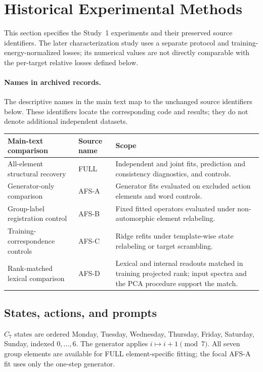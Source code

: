 \section{Historical Experimental Methods}
\label{app:methods}
This section specifies the Study~1 experiments and their preserved source identifiers. The later characterization study uses a separate protocol and training-energy-normalized losses; its numerical values are not directly comparable with the per-target relative losses defined below.

\paragraph{Names in archived records.}
The descriptive names in the main text map to the unchanged source identifiers below. These identifiers locate the corresponding code and results; they do not denote additional independent datasets.
\begin{center}
\small
\begin{tabular}{@{}p{}p{}p{}@{}}
\toprule
Main-text comparison & Source name & Scope \\
\midrule
All-element structural recovery & FULL & Independent and joint fits, prediction and consistency diagnostics, and controls. \\
Generator-only comparison & AFS-A & Generator fits evaluated on excluded action elements and word controls. \\
Group-label registration control & AFS-B & Fixed fitted operators evaluated under non-automorphic element relabeling. \\
Training-correspondence controls & AFS-C & Ridge refits under template-wise state relabeling or target scrambling. \\
Rank-matched lexical comparison & AFS-D & Lexical and internal readouts matched in training projected rank; input spectra and the PCA procedure support the match. \\
\bottomrule
\end{tabular}
\end{center}
\subsection{States, actions, and prompts}
$C_7$ states are ordered Monday, Tuesday, Wednesday, Thursday, Friday, Saturday, Sunday, indexed $0,\ldots,6$. The generator applies $i\mapsto i+1\pmod7$. All seven group elements are available for FULL element-specific fitting; the focal AFS-A fit uses only the one-step generator.

